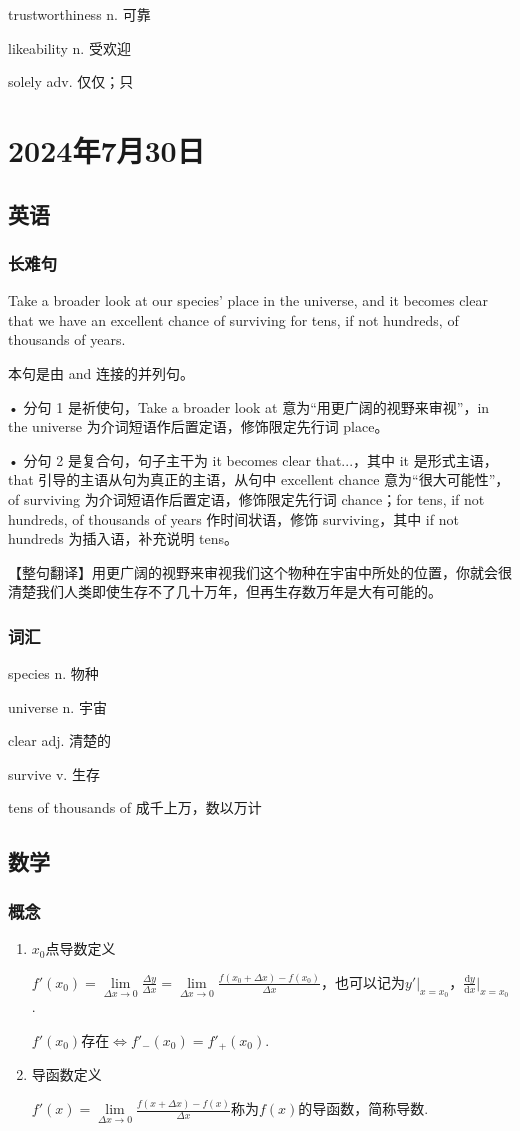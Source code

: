 \documentclass[UTF8]{ctexart}
\begin{document}
trustworthiness n. 可靠

likeability  n. 受欢迎

solely  adv. 仅仅；只
\section{2024年7月30日}
\subsection{英语}
\subsubsection{长难句}
Take a broader look at our species' place in the universe, and it becomes clear that we have an excellent chance of surviving for tens, if not hundreds, of thousands of years.

本句是由 and 连接的并列句。

• 分句 1 是祈使句，Take a broader look at 意为“用更广阔的视野来审视”，in the universe 为介词短语作后置定语，修饰限定先行词 place。

• 分句 2 是复合句，句子主干为 it becomes clear that...，其中 it 是形式主语，that 引导的主语从句为真正的主语，从句中 excellent chance 意为“很大可能性”，of surviving 为介词短语作后置定语，修饰限定先行词 chance；for tens, if not hundreds, of thousands of years 作时间状语，修饰 surviving，其中 if not hundreds 为插入语，补充说明 tens。

【整句翻译】用更广阔的视野来审视我们这个物种在宇宙中所处的位置，你就会很清楚我们人类即使生存不了几十万年，但再生存数万年是大有可能的。
\subsubsection{词汇}
species  n. 物种

universe  n. 宇宙

clear  adj. 清楚的

survive  v. 生存

tens of thousands of 成千上万，数以万计
\subsection{数学}
\subsubsection{概念}
\begin{enumerate}
      \item $x_0$点导数定义

            ${f}'(x_0)=\lim\limits_{\Delta x \to 0}\frac{\Delta y}{\Delta x}=\lim\limits_{\Delta x \to 0}\frac{f(x_0+\Delta x)-f(x_0)}{\Delta x}$，也可以记为${y}' |_{x=x_0} $，$\frac{\mathrm{d} y}{\mathrm{d} x} |_{x=x_0}$.

            ${f}'(x_0)$存在$\Leftrightarrow{f}'_-(x_0)={f}'_+(x_0)$.
      \item 导函数定义

            ${f}'(x)=\lim\limits_{\Delta x\to 0}\frac{f(x+\Delta x)-f(x)}{\Delta x}$称为$f(x)$的导函数，简称导数.
\end{enumerate}
\end{document}
